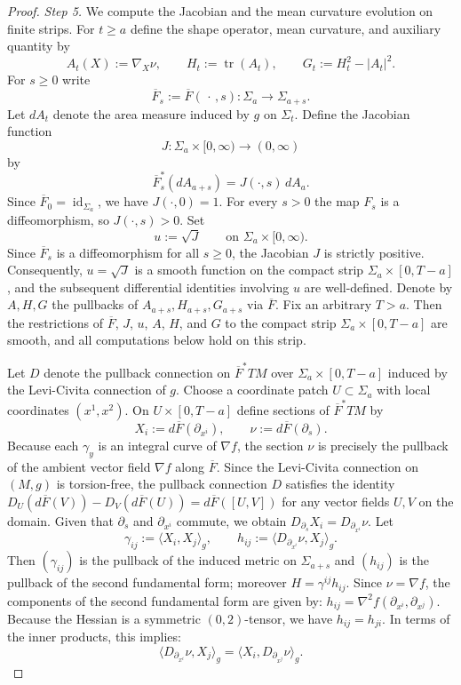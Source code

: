 \documentclass[12pt,oneside,a4paper]{article}
\theoremstyle{mytheorem}
\theoremstyle{remark}
\begin{document}
\begin{proof}
\textit{Step 5.} We compute the Jacobian and the mean curvature evolution on finite strips.
For $t\ge a$ define the shape operator, mean curvature, and auxiliary quantity by
\[
A_t(X):=\nabla_X\nu,\qquad H_t:=\operatorname{tr}(A_t),\qquad G_t:=H_t^2-|A_t|^2.
\]
For $s\ge 0$ write
\[
\overline{F}_s:=\overline{F}(\,\cdot\,,s):\Sigma_a\to\Sigma_{a+s}.
\]
Let $dA_t$ denote the area measure induced by $g$ on $\Sigma_t$. Define the Jacobian function
\[
J:\Sigma_a\times[0,\infty)\to(0,\infty)
\]
by
\[
\overline{F}_s^*(dA_{a+s})=J(\cdot,s)\,dA_a.
\]
Since $\overline{F}_0=\operatorname{id}_{\Sigma_a}$, we have $J(\cdot,0)=1$. For every $s>0$ the map $F_s$ is a diffeomorphism, so $J(\cdot,s)>0$. Set
\[
u:=\sqrt{J}\qquad\text{on }\Sigma_a\times[0,\infty).
\]
Since $\overline{F}_s$ is a diffeomorphism for all $s \ge 0$, the Jacobian $J$ is strictly positive. Consequently, $u = \sqrt{J}$ is a smooth function on the compact strip $\Sigma_a \times [0, T-a]$, and the subsequent differential identities involving $u$ are well-defined.
Denote by $A,H,G$ the pullbacks of $A_{a+s},H_{a+s},G_{a+s}$ via $\overline{F}$. Fix an arbitrary $T>a$. Then the restrictions of $\overline{F}$, $J$, $u$, $A$, $H$, and $G$ to the compact strip $\Sigma_a\times[0,T-a]$ are smooth, and all computations below hold on this strip.

Let $D$ denote the pullback connection on $\overline{F}^*TM$ over $\Sigma_a\times[0,T-a]$ induced by the Levi-Civita connection of $g$. Choose a coordinate patch $U\subset\Sigma_a$ with local coordinates $(x^1,x^2)$. On $U\times[0,T-a]$ define sections of $\overline{F}^*TM$ by
\[
X_i:=d\overline{F}(\partial_{x^i}),\qquad\nu:=d\overline{F}(\partial_s).
\]
Because each $\gamma_y$ is an integral curve of $\nabla f$, the section $\nu$ is precisely the pullback of the ambient vector field $\nabla f$ along $\overline{F}$. Since the Levi-Civita connection on $(M, g)$ is torsion-free, the pullback connection $D$ satisfies the identity $D_U(d\overline{F}(V)) - D_V(d\overline{F}(U)) = d\overline{F}([U, V])$ for any vector fields $U, V$ on the domain. Given that $\partial_s$ and $\partial_{x^i}$ commute, we obtain $D_{\partial_s}X_i = D_{\partial_{x^i}}\nu$.
Let
\[
\gamma_{ij}:=\langle X_i,X_j\rangle_g,\qquad h_{ij}:=\langle D_{\partial_{x^i}}\nu,X_j\rangle_g.
\]
Then $(\gamma_{ij})$ is the pullback of the induced metric on $\Sigma_{a+s}$ and $(h_{ij})$ is the pullback of the second fundamental form; moreover $H=\gamma^{ij}h_{ij}$. Since $\nu = \nabla f$, the components of the second fundamental form are given by: $h_{ij} = \nabla^2 f(\partial_{x^i}, \partial_{x^j}).$ Because the Hessian is a symmetric $(0, 2)$-tensor, we have $h_{ij} = h_{ji}$. In terms of the inner products, this implies:$$\langle D_{\partial_{x^i}} \nu, X_j \rangle_g = \langle X_i, D_{\partial_{x^j}} \nu \rangle_g.$$


\end{proof}
\end{document}
